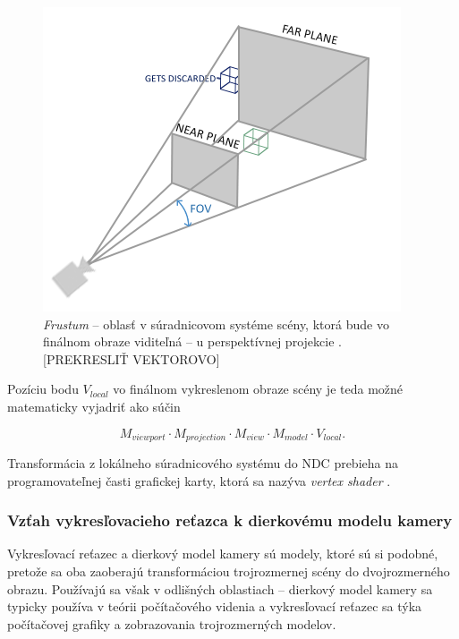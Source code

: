 \begin{figure}[h!]
    \centering
    \includegraphics[width=0.5\linewidth]{text_prace/obrazky-figures/perspektivna_projekcia_frustum.png}
    \caption{\emph{Frustum} -- oblasť v súradnicovom systéme scény, ktorá bude vo finálnom obraze viditeľná -- u perspektívnej projekcie \cite{de_vries_coordinate_systems}. [PREKRESLIŤ VEKTOROVO]}
    \label{fig:perspektivna_projekcia_frustum}
\end{figure}

Pozíciu bodu $V_{local}$ vo finálnom vykreslenom obraze scény je teda možné matematicky vyjadriť ako súčin

$$ M_{viewport} \cdot M_{projection} \cdot M_{view} \cdot M_{model} \cdot V_{local} \mathrm{.}$$

Transformácia z lokálneho súradnicového systému do NDC prebieha na programovateľnej časti grafickej karty, ktorá sa nazýva \emph{vertex shader} \cite{de_vries_coordinate_systems}.

\subsubsection{Vzťah vykresľovacieho reťazca k dierkovému modelu kamery}

Vykresľovací reťazec a dierkový model kamery sú modely, ktoré sú si podobné, pretože sa oba zaoberajú transformáciou trojrozmernej scény do dvojrozmerného obrazu. Používajú sa však v odlišných oblastiach -- dierkový model kamery sa typicky používa v teórii počítačového videnia a vykresľovací reťazec sa týka počítačovej grafiky a zobrazovania trojrozmerných modelov.

